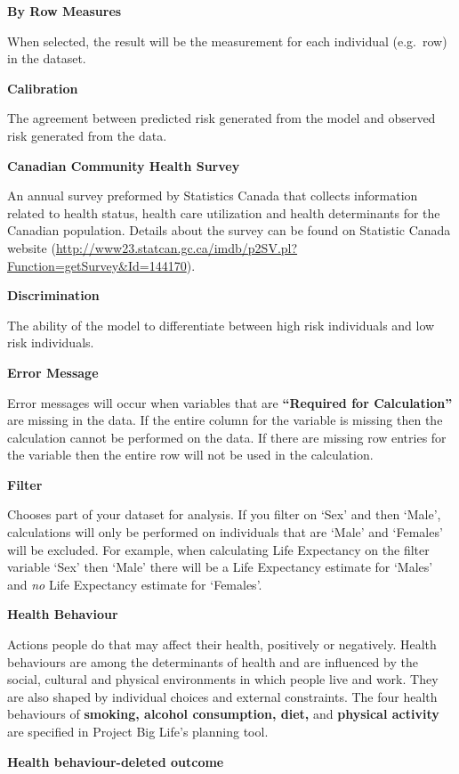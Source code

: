 \documentclass[]{book}
\begin{document}
\textbf{By Row Measures}

When selected, the result will be the measurement for
each individual (e.g.~row) in the dataset.

\textbf{Calibration}

The agreement between predicted risk generated from the model and
observed risk generated from the data.

\textbf{Canadian Community Health Survey}

An annual survey preformed by Statistics Canada that collects
information related to health status, health care utilization and health
determinants for the Canadian population. Details about the survey can
be found on Statistic Canada website
(\url{http://www23.statcan.gc.ca/imdb/p2SV.pl?Function=getSurvey\&Id=144170}).

\textbf{Discrimination}

The ability of the model to differentiate between high risk individuals
and low risk individuals.

\textbf{Error Message}

Error messages will occur when variables that are
\textbf{``Required for Calculation''} are missing in the data. If the
entire column for the variable is missing then the calculation cannot be
performed on the data. If there are missing row entries for the variable
then the entire row will not be used in the calculation.

\textbf{Filter}

Chooses part of your dataset for analysis. If you filter on
`Sex' and then `Male', calculations will only be performed on
individuals that are `Male' and `Females' will be excluded. For example,
when calculating Life Expectancy on the filter variable `Sex' then
`Male' there will be a Life Expectancy estimate for `Males' and
\emph{no} Life Expectancy estimate for `Females'.

\textbf{Health Behaviour}

Actions people do that may affect their health, positively or
negatively. Health behaviours are among the determinants of health and
are influenced by the social, cultural and physical environments in
which people live and work.\citep{StatsCan2010} They are also shaped by
individual choices and external constraints.\citep{StatsCan2010} The
four health behaviours of \textbf{smoking, alcohol consumption, diet,}
and \textbf{physical activity} are specified in Project Big Life's
planning tool.

\textbf{Health behaviour-deleted outcome}
\end{document}
